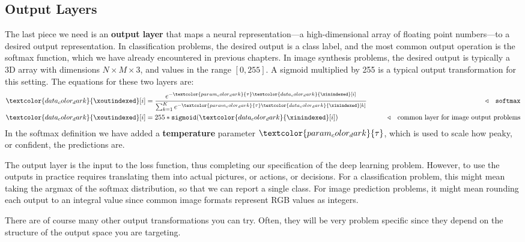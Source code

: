 \subsection{Output Layers}
The last piece we need is an \textbf{output layer} that maps a neural representation—a high-dimensional array of floating point numbers—to a desired output representation. In classification problems, the desired output is a class label, and the most common output operation is the softmax function, which we have already encountered in previous chapters. In image synthesis problems, the desired output is typically a 3D array with dimensions $N \times M \times 3$, and values in the range $[0,255]$. A sigmoid multiplied by 255 is a typical output transformation for this setting. The equations for these two layers are:
\begin{align}
    \textcolor{data_color_dark}{\xoutindexed}[i] &= \frac{e^{-\textcolor{param_color_dark}{\tau}\textcolor{data_color_dark}{\xinindexed}[i]}}{\sum_{k=1}^K e^{-\textcolor{param_color_dark}{\tau}\textcolor{data_color_dark}{\xinindexed}[k]}} & \quad\quad \triangleleft \quad \texttt{softmax}\\
    \textcolor{data_color_dark}{\xoutindexed}[i] &= 255*\texttt{sigmoid}(\textcolor{data_color_dark}{\xinindexed}[i]) & \quad\quad \triangleleft \quad \text{common layer for image output problems}
\end{align}
In the softmax definition we have added a {\bf temperature} parameter $\textcolor{param_color_dark}{\tau}$, which is used to scale how peaky, or confident, the predictions are.

The output layer is the input to the loss function, thus completing our specification of the deep learning problem. However, to use the outputs in practice requires translating them into actual pictures, or actions, or decisions. For a classification problem, this might mean taking the argmax of the softmax distribution, so that we can report a single class. For image prediction problems, it might mean rounding each output to an integral value since common image formats represent RGB values as integers.

There are of course many other output transformations you can try. Often, they will be very problem specific since they depend on the structure of the output space you are targeting.


